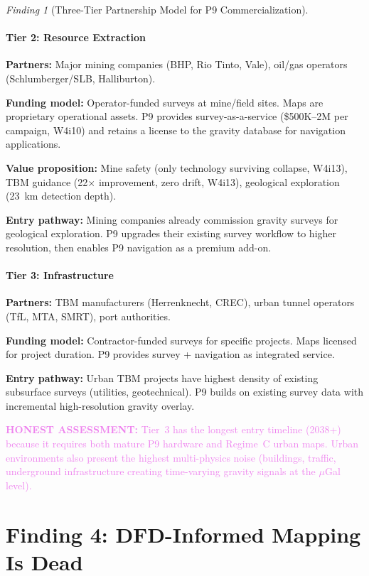 \documentclass[11pt]{article}
\theoremstyle{definition}
\theoremstyle{remark}
\newtheorem{finding}[theorem]{Finding}
\newcommand{\honest}[1]{\textcolor{violet}{\textbf{HONEST ASSESSMENT:} #1}}
\begin{document}
\begin{finding}[Three-Tier Partnership Model for P9 Commercialization]
\subsection*{Tier 2: Resource Extraction}

\textbf{Partners:} Major mining companies (BHP, Rio Tinto, Vale),
oil/gas operators (Schlumberger/SLB, Halliburton).

\textbf{Funding model:} Operator-funded surveys at mine/field sites.
Maps are proprietary operational assets. P9 provides survey-as-a-service
(\$500K--2M per campaign, W4i10) and retains a license to the gravity
database for navigation applications.

\textbf{Value proposition:} Mine safety (only technology surviving
collapse, W4i13), TBM guidance (22$\times$ improvement, zero drift,
W4i13), geological exploration (23~km detection depth).

\textbf{Entry pathway:} Mining companies already commission gravity
surveys for geological exploration. P9 upgrades their existing
survey workflow to higher resolution, then enables P9 navigation
as a premium add-on.

\subsection*{Tier 3: Infrastructure}

\textbf{Partners:} TBM manufacturers (Herrenknecht, CREC), urban
tunnel operators (TfL, MTA, SMRT), port authorities.

\textbf{Funding model:} Contractor-funded surveys for specific
projects. Maps licensed for project duration. P9 provides
survey + navigation as integrated service.

\textbf{Entry pathway:} Urban TBM projects have highest density
of existing subsurface surveys (utilities, geotechnical). P9
builds on existing survey data with incremental high-resolution
gravity overlay.

\honest{Tier~3 has the longest entry timeline (2038+) because
it requires both mature P9 hardware and Regime~C urban maps.
Urban environments also present the highest multi-physics
noise (buildings, traffic, underground infrastructure creating
time-varying gravity signals at the $\mu$Gal level).}
\end{finding}

\part{Finding 4: DFD-Informed Mapping Is Dead}
\label{part:dfd-mapping-dead}
\end{document}
